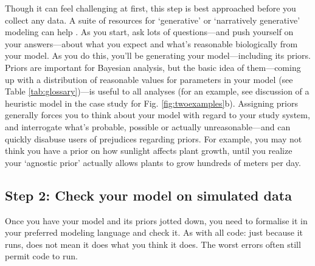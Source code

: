 \documentclass[11pt]{article}
\newcommand{\R}[1]{\label{}\linelabel{#1}}
\begin{document}
Though it can feel challenging at first, this step is best approached before you collect any data. A suite of resources for `generative' or `narratively generative' modeling can help \citep{statrethink,betangen}. %
As you start, ask lots of questions---and push yourself on your answers---about what you expect and what's reasonable biologically from your model. %
As you do this, you'll be generating your model---including its priors. Priors are important for Bayesian analysis, but the basic idea of them---coming up with a distribution of reasonable values for parameters in your model (see Table \ref{tab:glossary})---is useful to all analyses (for an example, see discussion of a heuristic model in the case study for Fig.  \ref{fig:twoexamples}b).\R{beyondMCMC4} Assigning priors generally forces you to think about your model with regard to your study system, and interrogate what's probable, possible or actually unreasonable---and can quickly disabuse users of prejudices regarding priors. For example, you may not think you have a prior on how sunlight affects plant growth, until you realize your `agnostic prior' actually allows plants to grow hundreds of meters per day. %

\subsection*{Step 2: Check your model on simulated data} 

Once you have your model and its priors jotted down, you need to formalise it in your preferred modeling language and check it. As with all code: just because it runs, does not mean it does what you think it does. The worst errors often still permit code to run. %
\end{document}
